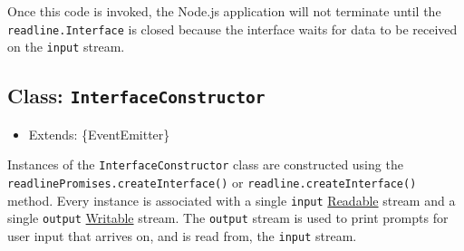 \begin{Shaded}
\begin{Highlighting}[]
\OperatorTok{=} \NormalTok{(}\NormalTok{)}\OperatorTok{;}
\NormalTok{ \{ }\OperatorTok{:}\OperatorTok{,} \OperatorTok{:}\OperatorTok{=} \NormalTok{(}\NormalTok{)}\OperatorTok{;}

\OperatorTok{=}\OperatorTok{,}\OperatorTok{;}

\NormalTok{(}\OperatorTok{,}\KeywordTok{=\textgreater{}}\NormalTok{ \{}
  \CommentTok{// }
  \NormalTok{(}\SpecialCharTok{$\{}\SpecialCharTok{\}}\VerbatimStringTok{\textasciigrave{}}\NormalTok{)}\OperatorTok{;}

\NormalTok{()}\OperatorTok{;}
\NormalTok{\})}\OperatorTok{;}
\end{Highlighting}
\end{Shaded}

Once this code is invoked, the Node.js application will not terminate
until the \texttt{readline.Interface} is closed because the interface
waits for data to be received on the \texttt{input} stream.

\subsection{\texorpdfstring{Class:
\texttt{InterfaceConstructor}}{Class: InterfaceConstructor}}\label{class-interfaceconstructor}

\begin{itemize}
\tightlist
\item
  Extends: \{EventEmitter\}
\end{itemize}

Instances of the \texttt{InterfaceConstructor} class are constructed
using the \texttt{readlinePromises.createInterface()} or
\texttt{readline.createInterface()} method. Every instance is associated
with a single \texttt{input}
\href{stream.md\#readable-streams}{Readable} stream and a single
\texttt{output} \href{stream.md\#writable-streams}{Writable} stream. The
\texttt{output} stream is used to print prompts for user input that
arrives on, and is read from, the \texttt{input} stream.

